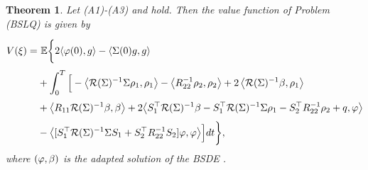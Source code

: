 \documentclass[11pt,times,twoside]{article}
\def\dbE{\mathbb{E}} \def\sE{\mathscr{E}} \def\fE{\mathfrak{E}} \def\cE{{\cal E}} \def\BE{{\bf E}} \def\Be{{\bf e}}
\def\b{\beta}         \def\D{\Delta}   \def\d{\delta}   \def\F{\Phi}     \def\p{\phi}
\newtheorem{theorem}{Theorem}[section]
\begin{document}
\begin{theorem}
Let (A1)-(A3) and  hold. Then the value function of Problem (BSLQ) is given by
%
\begin{equation}\begin{aligned}
\ns\ds V(\xi)=&\ \dbE \bigg\{2\lan  \f(0),g\ran - \lan  \Si(0)g, g\ran\\
%
\ns\ds & +\int_{0}^{T} \Big[
 -\left\lan \mathcal{R}(\Si)^{-1}\Si\rho_1, \rho_1 \right\ran
 -\left\lan R_{22}^{-1}\rho_2,\rho_2 \right\ran
 +2\left\lan \mathcal{R}(\Si)^{-1}\beta, \rho_1 \right\ran \\
%
\ns\ds &+\left\lan  R_{11} \mathcal{R}(\Si)^{-1} \beta, \beta\right\ran
%
+2 \big\lan  S_{1}^{\top} \mathcal{R}(\Si)^{-1} \beta
-S_{1}^{\top} \mathcal{R}(\Si)^{-1} \Si\rho_1-S_{2}^{\top} R_{22}^{-1}\rho_2+q, \varphi \big\ran \\
%
\ns\ds &-\big\lan  [S_{1}^{\top} \mathcal{R}(\Si)^{-1} \Si S_{1}+S_{2}^{\top} R_{22}^{-1} S_{2} ] \varphi, \varphi\big\ran \Big] d t\bigg\}, \label{4.14}
\end{aligned}\end{equation}
%
where $(\f,\b)$ is the adapted solution of the BSDE .
%
\end{theorem}
\end{document}
